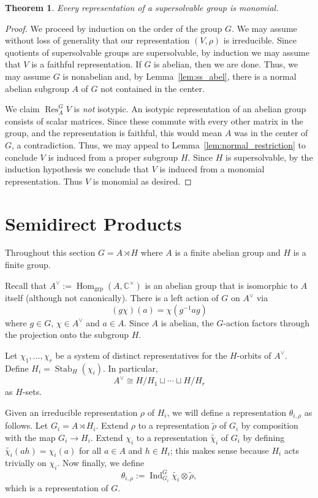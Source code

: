 \documentclass[12pt]{article}
\theoremstyle{plain}
\newtheorem{theorem}{Theorem}[section]
\theoremstyle{definition}
\theoremstyle{remark}
\numberwithin{equation}{section}
\begin{document}
\begin{theorem}
Every representation of a supersolvable group is monomial.
\end{theorem}

\begin{proof}
We proceed by induction on the order of the group $G$.
We may assume without loss of generality that our representation
$(V,\rho)$ is irreducible.
Since quotients of supersolvable groups are supersolvable,
by induction we may assume that $V$ is a faithful representation.
If $G$ is abelian, then we are done.
Thus, we may assume $G$ is nonabelian and, by Lemma~\ref{lem:ss_abel},
there is a normal abelian subgroup $A$ of $G$ not contained in the center.

We claim $\operatorname{Res}^G_A V$ is \emph{not} isotypic.
An isotypic representation of an abelian group consists of scalar
matrices.  Since these commute with every other matrix in the group,
and the representation is faithful, this would mean $A$ was in the center
of $G$, a contradiction.
Thus, we may appeal to Lemma~\ref{lem:normal_restriction}
to conclude $V$ is induced from a proper subgroup $H$.
Since $H$ is supersolvable, by the induction hypothesis we conclude that
$V$ is induced from a monomial representation.
Thus $V$ is monomial as desired.
\end{proof}

\section{Semidirect Products}

Throughout this section $G = A \rtimes H$
where $A$ is a finite abelian group and $H$ is a finite group.

Recall that $A^\vee :=
\operatorname{Hom}_{\mathrm{grp}}(A,\mathbb{C}^\times)$
is an abelian group that is isomorphic to $A$ itself (although not
canonically).
There is a left action of $G$ on $A^\vee$ via
\[
(g\chi)(a)=\chi(g^{-1}ag)
\]
where $g \in G$, $\chi \in A^\vee$ and $a \in A$.
Since $A$ is abelian, the $G$-action factors through the projection
onto the subgroup $H$.

Let $\chi_1,\ldots, \chi_r$ be a system of distinct representatives
for the $H$-orbits of $A^\vee$.  Define
$H_i=\operatorname{Stab}_H(\chi_i)$.
In particular,
\[
A^\vee \cong H/H_1 \sqcup \cdots \sqcup H/H_r
\]
as $H$-sets.

Given an irreducible representation $\rho$ of $H_i$,
we will define a representation $\theta_{i,\rho}$ as follows.
Let $G_i= A \rtimes H_i$.
Extend $\rho$ to a representation $\widetilde{\rho}$ of $G_i$
by composition with the map $G_i \to H_i$.
Extend $\chi_i$ to a representation $\widetilde{\chi_i}$ of $G_i$
by defining $\widetilde{\chi_i}(ah)=\chi_i(a)$
for all $a \in A$ and $h \in H_i$; this makes sense because
$H_i$ acts trivially on $\chi_i$.
Now finally, we define
\[
\theta_{i,\rho} := \operatorname{Ind}_{G_i}^G
\widetilde{\chi_i} \otimes \widetilde{\rho},
\]
which is a representation of $G$.
\end{document}
